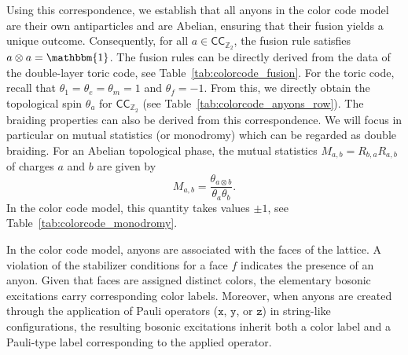 \documentclass[a4paper,11pt]{article}
\newcommand{\Zbb}{\mathbb{Z}}
\theoremstyle{definition}
\theoremstyle{remark}
\theoremstyle{remark}
\newcommand{\one}{\mathbbm{1}}
\newcommand{\CC}{\mathsf{CC}_{\Zbb_2}}
\begin{document}
Using this correspondence, we establish that all anyons in the color code model are their own antiparticles and are Abelian, ensuring that their fusion yields a unique outcome. Consequently, for all \( a \in \mathsf{CC}_{\mathbb{Z}_2} \), the fusion rule satisfies \( a \otimes a = \one \). 
The fusion rules can be directly derived from the data of the double-layer toric code, see Table~\ref{tab:colorcode_fusion}.
For the toric code, recall that $\theta_{1}=\theta_{e}=\theta_m=1$ and $\theta_f=-1$. From this, we directly obtain the topological spin $\theta_a$ for $\CC$ (see Table~\ref{tab:colorcode_anyons_row}).
The braiding properties can also be derived from this correspondence. We will focus in particular on mutual statistics (or monodromy) which can be regarded as double braiding. For an Abelian topological phase, the mutual statistics \( M_{a,b} = R_{b,a} R_{a,b} \) of charges \( a \) and \( b \) are given by
\begin{equation*}
    M_{a,b} = \frac{\theta_{a \otimes b}}{\theta_a \theta_b}.
\end{equation*}
In the color code model, this quantity takes values \( \pm 1 \), see Table~\ref{tab:colorcode_monodromy}. 

In the color code model, anyons are associated with the faces of the lattice. A violation of the stabilizer conditions for a face \( f \) indicates the presence of an anyon. Given that faces are assigned distinct colors, the elementary bosonic excitations carry corresponding color labels. Moreover, when anyons are created through the application of Pauli operators (\( \mathtt{x} \), \(\mathtt{y} \), or \( \mathtt{z} \)) in string-like configurations, the resulting bosonic excitations inherit both a color label and a Pauli-type label corresponding to the applied operator.
\end{document}
